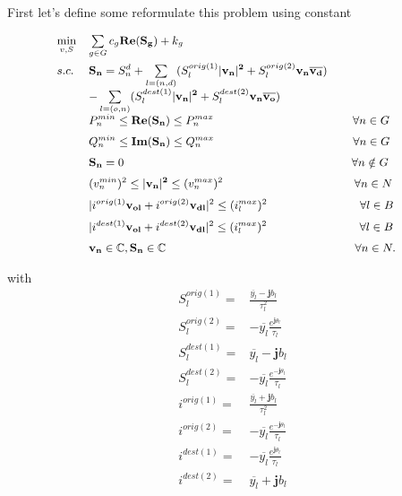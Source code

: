 \documentclass{article}
\begin{document}
First let's define some reformulate this problem using constant


\begin{equation}
\begin{small}
\begin{array}{lll}
    \min\limits_{v, S} & \sum\limits_{g\in G}c_g\mathbf{Re(S_g)}+k_g& \\[4mm]
    s.c. & \mathbf{S_n} = S_n^{d} + \sum\limits_{l=(n,d)}(S^{orig(1)}_l\mathbf{|v_n|^2} + S^{orig(2)}_l\mathbf{v_n\overline{v_d}})\\
         & - \sum\limits_{l=(o,n)}(S^{dest(1)}_l\mathbf{|v_n|^2} + S^{dest(2)}_l\mathbf{v_n\overline{v_o}})\\
         & P_n^{min} \leq \mathbf{Re(S_n)}\leq P_n^{max} ~~~~~~~~~~~~~~~~~~~~~~~~~~~~~~~~~~~~ \forall n \in G\\[2mm]
         & Q_n^{min} \leq \mathbf{Im(S_n)}\leq Q_n^{max} ~~~~~~~~~~~~~~~~~~~~~~~~~~~~~~~~~~~~  \forall n \in G\\[2mm]
         & \mathbf{S_n}=0  ~~~~~~~~~~~~~~~~~~~~~~~~~~~~~~~~~~~~~~~~~~~~~~~~~~~~~~~~~~~  \forall n \notin G\\[2mm]
         & (v_n^{min})^2 \leq \mathbf{|v_n|^2} \leq (v_n^{max})^2 ~~~~~~~~~~~~~~~~~~~~~~~~~~~~~~~~~~ \forall n \in N \\[2mm]
         & |i^{orig(1)}\mathbf{v_{ol}} + i^{orig{(2)}}\mathbf{v_{dl}}|^2 \leq (i_{l}^{max})^2 ~~~~~~~~~~~~~~~~~~~~~~~~ \forall l \in B\\[2mm]
         & |i^{dest(1)}\mathbf{v_{ol}} + i^{dest{(2)}}\mathbf{v_{dl}}|^2 \leq (i_{l}^{max})^2 ~~~~~~~~~~~~~~~~~~~~~~~~ \forall l \in B\\[2mm]
         & \mathbf{v_n} \in \mathbb{C}, \mathbf{S_n} \in \mathbb{C} ~~~~~~~~~~~~~~~~~~~~~~~~~~~~~~~~~~~~~~~~~~~~~~~~~ \forall n \in N.
\end{array}
\end{small}
\label{OPF2}
\end{equation}

with
\[
    \begin{array}{ll}
        S^{orig(1)}_l =& \frac{\overline{y_l} - \mathbf{j}b_l}{\tau^2_l} \\
        S^{orig(2)}_l =& -\overline{y_l}\frac{e^{\mathbf{j}\theta_l}}{\tau_l} \\
        S^{dest(1)}_l =& \overline{y_l} - \mathbf{j}b_l \\
        S^{dest(2)}_l =& -\overline{y_l}\frac{e^{-\mathbf{j}\theta_l}}{\tau_l} \\
        i^{orig(1)} =& \frac{\overline{y_l} + \mathbf{j}b_l}{\tau_l^2}\\
        i^{orig(2)} =& -\overline{y_l}\frac{e^{-\mathbf{j}\theta_l}}{\tau_l}\\
        i^{dest(1)} =& -\overline{y_l}\frac{e^{\mathbf{j}\theta_l}}{\tau_l}\\
        i^{dest(2)} =& \overline{y_l} + \mathbf{j}b_l\\\
    \end{array}
\]
\end{document}
